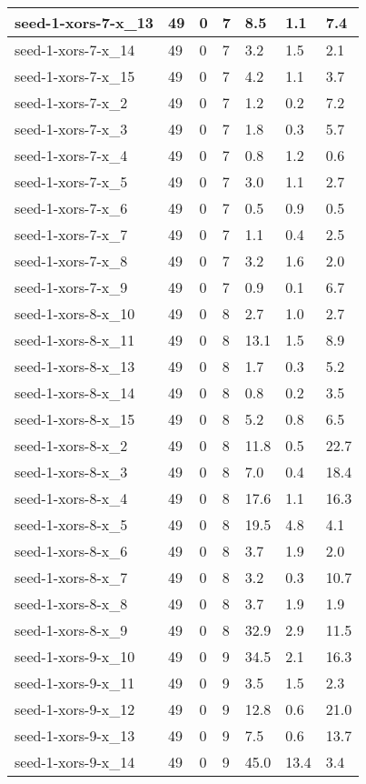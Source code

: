 \begin{scriptsize}
\begin{longtable}{|p{5cm}|l|l|l|l|l|l|}
seed-1-xors-7-x\_13&49&0&7&8.5&1.1&7.4 \\ \hline 
seed-1-xors-7-x\_14&49&0&7&3.2&1.5&2.1 \\ \hline 
seed-1-xors-7-x\_15&49&0&7&4.2&1.1&3.7 \\ \hline 
seed-1-xors-7-x\_2&49&0&7&1.2&0.2&7.2 \\ \hline 
seed-1-xors-7-x\_3&49&0&7&1.8&0.3&5.7 \\ \hline 
seed-1-xors-7-x\_4&49&0&7&0.8&1.2&0.6 \\ \hline 
seed-1-xors-7-x\_5&49&0&7&3.0&1.1&2.7 \\ \hline 
seed-1-xors-7-x\_6&49&0&7&0.5&0.9&0.5 \\ \hline 
seed-1-xors-7-x\_7&49&0&7&1.1&0.4&2.5 \\ \hline 
seed-1-xors-7-x\_8&49&0&7&3.2&1.6&2.0 \\ \hline 
seed-1-xors-7-x\_9&49&0&7&0.9&0.1&6.7 \\ \hline 
seed-1-xors-8-x\_10&49&0&8&2.7&1.0&2.7 \\ \hline 
seed-1-xors-8-x\_11&49&0&8&13.1&1.5&8.9 \\ \hline 
seed-1-xors-8-x\_13&49&0&8&1.7&0.3&5.2 \\ \hline 
seed-1-xors-8-x\_14&49&0&8&0.8&0.2&3.5 \\ \hline 
seed-1-xors-8-x\_15&49&0&8&5.2&0.8&6.5 \\ \hline 
seed-1-xors-8-x\_2&49&0&8&11.8&0.5&22.7 \\ \hline 
seed-1-xors-8-x\_3&49&0&8&7.0&0.4&18.4 \\ \hline 
seed-1-xors-8-x\_4&49&0&8&17.6&1.1&16.3 \\ \hline 
seed-1-xors-8-x\_5&49&0&8&19.5&4.8&4.1 \\ \hline 
seed-1-xors-8-x\_6&49&0&8&3.7&1.9&2.0 \\ \hline 
seed-1-xors-8-x\_7&49&0&8&3.2&0.3&10.7 \\ \hline 
seed-1-xors-8-x\_8&49&0&8&3.7&1.9&1.9 \\ \hline 
seed-1-xors-8-x\_9&49&0&8&32.9&2.9&11.5 \\ \hline 
seed-1-xors-9-x\_10&49&0&9&34.5&2.1&16.3 \\ \hline 
seed-1-xors-9-x\_11&49&0&9&3.5&1.5&2.3 \\ \hline 
seed-1-xors-9-x\_12&49&0&9&12.8&0.6&21.0 \\ \hline 
seed-1-xors-9-x\_13&49&0&9&7.5&0.6&13.7 \\ \hline 
seed-1-xors-9-x\_14&49&0&9&45.0&13.4&3.4 \\ \hline 

\end{longtable}
\end{scriptsize}
